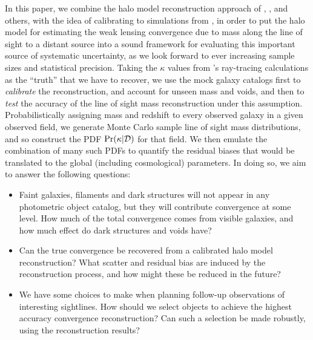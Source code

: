 \documentclass[useAMS,usenatbib]{mn2e}
\begin{document}
In this paper, we combine the halo model reconstruction approach of
\citeauthor{GunnarssonEtal2006}, \citeauthor{JonssonEtal2010}, 
\citeauthor{WongEtal2011} and others, with the
idea of calibrating to simulations from \citeauthor{SuyuEtal2010}, in
order to put the halo model for  estimating the weak lensing convergence
due to mass along the line of sight to a distant source into a sound
framework for evaluating this important source of systematic
uncertainty, as we look forward to ever increasing sample sizes and
statistical precision. Taking the $\kappa$ values from
\citeauthor{HilbertEtal2009}'s ray-tracing calculations as the ``truth''
that we have to recover, we use the \MS mock galaxy catalogs first to
{\it calibrate} the reconstruction, and account for unseen mass and
voids, and then to {\it test} the accuracy of the line of sight mass
reconstruction under this assumption. Probabilistically assigning mass
and redshift to every observed galaxy in a given observed field, we
generate Monte Carlo sample line of sight mass distributions, and so
construct the PDF $\Pr(\kappa|{\mathcal{D}})$ for that field. We then emulate
the combination of many such PDFs to quantify the residual biases that
would be translated to the global (including cosmological) parameters.
In doing so, we aim to answer the following questions: 

\begin{itemize}

\item Faint galaxies, filaments and dark structures will not appear in
any photometric object catalog, but they will contribute convergence at
some level. How much of the total convergence comes from visible
galaxies, and how much effect do dark structures and voids have? 

\item Can the true convergence be recovered from a calibrated halo model
reconstruction? What scatter and residual bias are induced by the
reconstruction process, and how might these be reduced in the future? 

\item We have some choices to make when planning follow-up observations
of interesting sightlines. How should we select objects to achieve the
highest accuracy convergence reconstruction? Can such a selection be
made robustly, using the reconstruction results?

\end{itemize}
\end{document}
